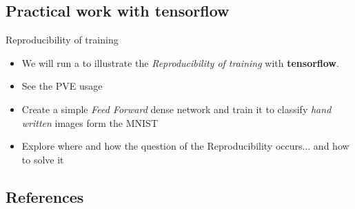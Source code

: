 \documentclass[10pt,serif,mathserif,compress,hyperref={colorlinks}]{beamer}
\begin{document}
\subsection{Practical work with tensorflow}

\begin{frame}{Reproducibility of training}
  
  \begin{tcolorbox}[title=Practical work with tensorflow]
    
    \begin{itemize}
    \item<1-> We will run a  to illustrate the {\it Reproducibility of training} with {\bf tensorflow}.
    \item<2-> See the PVE usage
    \item<3-> Create a simple {\it Feed Forward} dense network and train it to classify {\it hand written} images form the MNIST
    \item<4-> Explore where and how the question of the Reproducibility occurs... and how to solve it 
    \end{itemize}
  \end{tcolorbox}

    
\end{frame}
 
\subsection{References}
\end{document}
